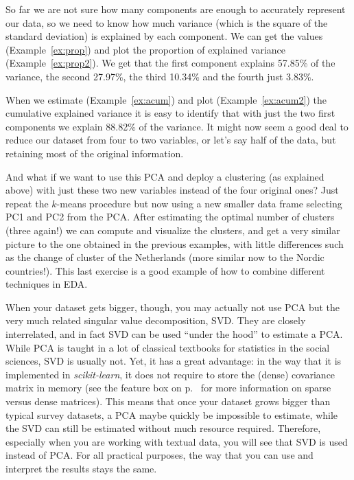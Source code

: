 
So far we are not sure  how many components are enough to accurately represent our data, so we need to know how much variance (which is the square of the standard deviation) is explained by each component. We can get the values (Example~\ref{ex:prop}) and plot  the proportion of explained variance (Example~\ref{ex:prop2}). We get that the first component explains 57.85\% of the variance, the second 27.97\%, the third 10.34\% and the fourth just 3.83\%.


When we estimate (Example~\ref{ex:acum}) and plot (Example~\ref{ex:acum2}) the cumulative explained variance it is easy to identify that with just the two first components we explain 88.82\% of the variance. It might now seem a good deal to reduce our dataset from four to two variables, or let’s say half of the data, but retaining most of the original information.


And what if we want to use this PCA and deploy a clustering (as explained above) with just these two new variables instead of the four original ones?  Just repeat the $k$-means procedure but now using a new smaller data frame selecting PC1 and PC2 from the PCA. After estimating the optimal number of clusters (three again!) we can compute and visualize the clusters, and get a very similar picture to the one obtained in the previous examples, with little differences such as the change of cluster of the Netherlands (more similar now to the Nordic countries!). This last exercise is a good example of how to combine different techniques in EDA.


When your dataset gets bigger, though, you may actually not use PCA
but the very much related singular value decomposition, SVD. They are
closely interrelated, and in fact SVD can be used ``under the hood''
to estimate a PCA. While PCA is taught in a lot of classical textbooks
for statistics in the social sciences, SVD is usually not. Yet, it has
a great advantage: in the way that it is implemented in
\emph{scikit-learn}, it does not require to store the (dense)
covariance matrix in memory (see the feature box
on p.~\pageref{feature:sparse} for more information on sparse versus dense
matrices). This means that once  your dataset grows bigger than
typical survey datasets, a PCA maybe quickly be impossible to estimate,
while the SVD can still be estimated without much resource
required. Therefore, especially when you are working with textual data,
you will see that SVD is used instead of PCA. For all practical
purposes, the way that  you can use and interpret the results stays the
same.

